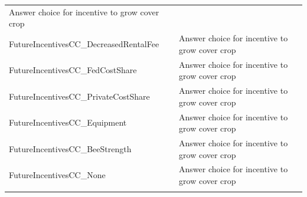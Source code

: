 \documentclass[12pt,]{article}
\begin{document}
\begin{longtable}[]{@{}ll@{}}
\begin{minipage}[t]{0.18\columnwidth}
Answer choice for incentive to grow cover crop\strut
\end{minipage}\tabularnewline
\begin{minipage}[t]{0.59\columnwidth}\raggedright\strut
FutureIncentivesCC\_DecreasedRentalFee\strut
\end{minipage} & \begin{minipage}[t]{0.18\columnwidth}\raggedright\strut
Answer choice for incentive to grow cover crop\strut
\end{minipage}\tabularnewline
\begin{minipage}[t]{0.59\columnwidth}\raggedright\strut
FutureIncentivesCC\_FedCostShare\strut
\end{minipage} & \begin{minipage}[t]{0.18\columnwidth}\raggedright\strut
Answer choice for incentive to grow cover crop\strut
\end{minipage}\tabularnewline
\begin{minipage}[t]{0.59\columnwidth}\raggedright\strut
FutureIncentivesCC\_PrivateCostShare\strut
\end{minipage} & \begin{minipage}[t]{0.18\columnwidth}\raggedright\strut
Answer choice for incentive to grow cover crop\strut
\end{minipage}\tabularnewline
\begin{minipage}[t]{0.59\columnwidth}\raggedright\strut
FutureIncentivesCC\_Equipment\strut
\end{minipage} & \begin{minipage}[t]{0.18\columnwidth}\raggedright\strut
Answer choice for incentive to grow cover crop\strut
\end{minipage}\tabularnewline
\begin{minipage}[t]{0.59\columnwidth}\raggedright\strut
FutureIncentivesCC\_BeeStrength\strut
\end{minipage} & \begin{minipage}[t]{0.18\columnwidth}\raggedright\strut
Answer choice for incentive to grow cover crop\strut
\end{minipage}\tabularnewline
\begin{minipage}[t]{0.59\columnwidth}\raggedright\strut
FutureIncentivesCC\_None\strut
\end{minipage} & \begin{minipage}[t]{0.18\columnwidth}\raggedright\strut
Answer choice for incentive to grow cover crop\strut
\end{minipage}\tabularnewline
\begin{minipage}[t]{0.59\columnwidth}\raggedright\strut

\end{minipage}
\end{longtable}
\end{document}
